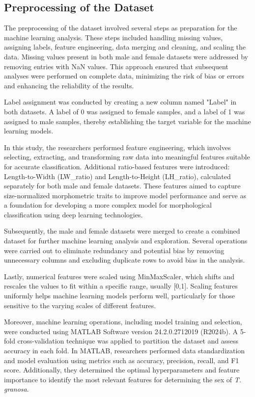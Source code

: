 \subsection{Preprocessing of the Dataset}
\label{sec:pre-processing}

The preprocessing of the dataset involved several steps as preparation for the machine learning analysis. These steps included handling missing values, assigning labels, feature engineering, data merging and cleaning, and scaling the data. Missing values present in both male and female datasets were addressed by removing entries with NaN values. This approach ensured that subsequent analyses were performed on complete data, minimizing the risk of bias or errors and enhancing the reliability of the results.

Label assignment was conducted by creating a new column named "Label" in both datasets. A label of 0 was assigned to female samples, and a label of 1 was assigned to male samples, thereby establishing the target variable for the machine learning models.

In this study, the researchers performed feature engineering, which involves selecting, extracting, and transforming raw data into meaningful features suitable for accurate classification. Additional ratio-based features were introduced: Length-to-Width (LW\_ratio) and Length-to-Height (LH\_ratio), calculated separately for both male and female datasets. These features aimed to capture size-normalized morphometric traits to improve model performance and serve as a foundation for developing a more complex model for morphological classification using deep learning technologies.

Subsequently, the male and female datasets were merged to create a combined dataset for further machine learning analysis and exploration. Several operations were carried out to eliminate redundancy and potential bias by removing unnecessary columns and excluding duplicate rows to avoid bias in the analysis.

Lastly, numerical features were scaled using MinMaxScaler, which shifts and rescales the values to fit within a specific range, usually [0,1]. Scaling features uniformly helps machine learning models perform well, particularly for those sensitive to the varying scales of different features.

Moreover, machine learning operations, including model training and selection, were conducted using MATLAB Software version 24.2.0.2712019 (R2024b). A 5-fold cross-validation technique was applied to partition the dataset and assess accuracy in each fold. In MATLAB, researchers performed data standardization and model evaluation using metrics such as accuracy, precision, recall, and F1 score. Additionally, they determined the optimal hyperparameters and feature importance to identify the most relevant features for determining the sex of \textit{T. granosa}.




